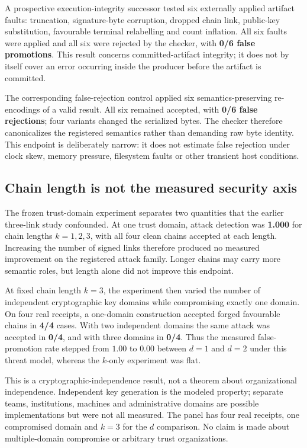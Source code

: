 A prospective execution-integrity successor tested six externally applied artifact
faults: truncation, signature-byte corruption, dropped chain link, public-key
substitution, favourable terminal relabelling and count inflation. All six faults
were applied and all six were rejected by the checker, with \textbf{0/6 false
promotions}. This result concerns committed-artifact integrity; it does not by
itself cover an error occurring inside the producer before the artifact is
committed.

The corresponding false-rejection control applied six semantics-preserving
re-encodings of a valid result. All six remained accepted, with \textbf{0/6 false
rejections}; four variants changed the serialized bytes. The checker therefore
canonicalizes the registered semantics rather than demanding raw byte identity.
This endpoint is deliberately narrow: it does not estimate false rejection under
clock skew, memory pressure, filesystem faults or other transient host conditions.

\subsection{Chain length is not the measured security axis}

The frozen trust-domain experiment separates two quantities that the earlier
three-link study confounded. At one trust domain, attack detection was
\textbf{1.000} for chain lengths $k=1,2,3$, with all four clean chains accepted at
each length. Increasing the number of signed links therefore produced no measured
improvement on the registered attack family. Longer chains may carry more semantic
roles, but length alone did not improve this endpoint.

At fixed chain length $k=3$, the experiment then varied the number of independent
cryptographic key domains while compromising exactly one domain. On four real
receipts, a one-domain construction accepted forged favourable chains in
\textbf{4/4} cases. With two independent domains the same attack was accepted in
\textbf{0/4}, and with three domains in \textbf{0/4}. Thus the measured false-promotion
rate stepped from $1.00$ to $0.00$ between $d=1$ and $d=2$ under this threat model,
whereas the $k$-only experiment was flat.

This is a cryptographic-independence result, not a theorem about organizational
independence. Independent key generation is the modeled property; separate teams,
institutions, machines and administrative domains are possible implementations but
were not all measured. The panel has four real receipts, one compromised domain and
$k=3$ for the $d$ comparison. No claim is made about multiple-domain compromise or
arbitrary trust organizations.

